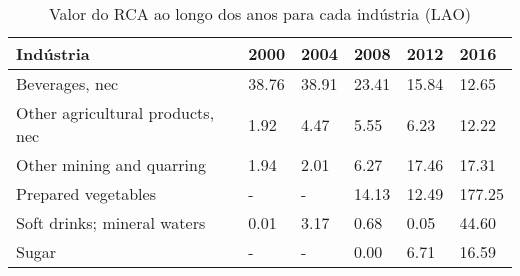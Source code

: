 \begin{table}
\centering
\caption{Valor do RCA ao longo dos anos para cada indústria (LAO)}
\begin{tabular}{p{6cm}p{1.5cm}p{1.5cm}p{1.5cm}p{1.5cm}p{1.5cm}}
\toprule
                       Indústria &  2000 &  2004 &  2008 &  2012 &   2016 \\
\midrule
                  Beverages, nec & 38.76 & 38.91 & 23.41 & 15.84 &  12.65 \\
Other agricultural products, nec &  1.92 &  4.47 &  5.55 &  6.23 &  12.22 \\
       Other mining and quarring &  1.94 &  2.01 &  6.27 & 17.46 &  17.31 \\
             Prepared vegetables &     - &     - & 14.13 & 12.49 & 177.25 \\
     Soft drinks; mineral waters &  0.01 &  3.17 &  0.68 &  0.05 &  44.60 \\
                           Sugar &     - &     - &  0.00 &  6.71 &  16.59 \\
\bottomrule
\end{tabular}
\end{table}
